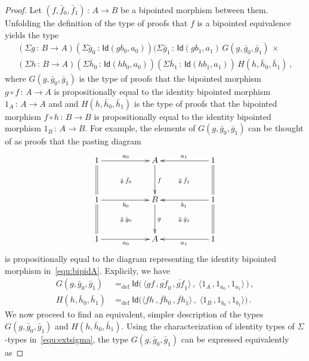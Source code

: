 \documentclass[10pt,a4paper,oneside,reqno]{amsart}
\numberwithin{equation}{section}
\theoremstyle{mythm}
\theoremstyle{mydef}
\theoremstyle{myrmk}
\newcommand{\defeq}{=_{\mathrm{def}}}
\newcommand{\co}{\,{:}\,}
\newcommand{\Id}{\mathsf{Id}}
\begin{document}
\begin{proof}
Let  $(f, \bar{f}_0, \bar{f}_1) \co A \to B$ be a bipointed morphism between them. Unfolding the definition
of  the type of proofs that $f$ is a bipointed equivalence yields the type
\begin{multline*} 
(\Sigma g \co B \to  A)
(\Sigma \bar{g}_0 \co \Id( g b_0, a_0)) 
(\Sigma  \bar{g}_1 \co \Id( g b_1, a_1) \, 
 G(g,\bar{g}_0,\bar{g}_1) \, \times \\
 \textstyle
 (\Sigma h \co B \to A)
 (\Sigma \bar{h}_0 \co \Id ( h b_0,  a_0))
 (\Sigma \bar{h}_1 \co  \Id ( h b_1,  a_1)) \, 
 H(h,\bar{h}_0,\bar{h}_1)   \, ,
\end{multline*}
where $G(g, \bar{g}_0, \bar{g}_1)$ is the type of proofs that the
bipointed morphism  $g \circ f \co A \to A$ is propositionally equal to the identity bipointed morphism
$1_A \co A \to A$ and and  $H(h, \bar{h}_0, \bar{h}_1)$ is the type of proofs that the
bipointed morphism  $f \circ h \co B \to B$ is propositionally equal to the identity bipointed morphism
$1_B \co A \to B$. For example, the elements of $G(g, \bar{g}_0, \bar{g}_1)$ can be thought of as
proofs that the pasting diagram 
\[
\xymatrix@C=2cm@R=1.2cm{
1    \ar[r]^{a_0} \ar@{=}[d]  \ar@{}[dr]|{\Downarrow \, \bar{f}_0} & A  \ar[d]^{f} & 1  \ar[l]_{a_1} \ar@{=}[d] \ar@{}[dl]|{\Downarrow \,  \bar{f}_1} \\
1 \ar[r]_{b_0}   \ar@{}[dr]|{\Downarrow \, \bar{g}_0}  \ar@{=}[d] & B \ar[d]^g   & 1 \ar[l]^{b_1} \ar@{=}[d] \ar@{}[dl]|{\Downarrow \,  \bar{g}_1} \\
1 \ar[r]_{a_0}  & A   & 1 \ar[l]^{a_1}}
\]
is propositionally equal to the diagram representing the identity bipointed morphism in~\eqref{equ:bipidA}. 
Explicily, we have
\begin{align*}
G(g,\bar{g}_0,\bar{g}_1) & \defeq 
\Id 
\big( \, 
\langle 
g f \, ,  \overline{gf}_0  \, ,    \overline{gf}_1 
\rangle \, , \;
\langle 
1_A \, ,  1_{a_0} \, , 1_{a_1} 
\rangle \, 
\big)  \, , \\
H(h,\bar{h}_0,\bar{h}_1) & \defeq 
\Id 
\big( 
\langle
 f  h \, ,   \overline{fh}_0 \, , \overline{fh}_1   
 \rangle \, , \; 
 \langle 
 1_B \, ,  1_{b_0} \, , 1_{b_1} 
 \rangle 
 \big) \, .
\end{align*}
We now proceed to find an equivalent, simpler description of the types $G(g, \bar{g}_0, \bar{g}_1)$ and $H(h, \bar{h}_0, \bar{h}_1)$.  Using the characterization of identity types of $\Sigma$-types in~\eqref{equ:extsigma}, the type $G(g,\bar{g}_0,\bar{g}_1)$ can be  expressed equivalently as

\end{proof}
\end{document}
